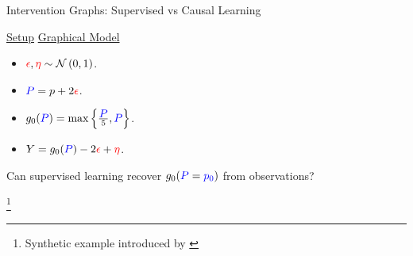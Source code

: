 \documentclass[xcolor={dvipsnames}]{beamer}
\newcommand{\source}[1]{{\let\thefootnote\relax\footnote{{\tiny #1}}}}
\newcommand{\policy}{\mbox{\textcolor{blue}{$P$}}}
\newcommand{\response}{\mbox{\textcolor{black}{$Y$}}}
\newcommand{\confounder}{\mbox{\textcolor{red}{$\epsilon$}}}
\begin{document}
    \begin{frame}{Intervention Graphs: Supervised vs Causal Learning}

        \begin{center} \Large \underline{Setup} \hspace{4cm} \underline{Graphical Model} \end{center}

        \begin{minipage}[c]{0.55\textwidth}
            \begin{itemize}
                \item \( \confounder{}, \textcolor{red}{\eta} \sim \calN\rbr{0,1} \).
                \item \( \policy{} = p + 2 \confounder{} \).
                \item \( g_0(\policy{}) = \max\cbr{\frac{\policy{}}{5}, \policy{}} \).
                \item \( \response{} = g_0(\policy{}) - 2 \confounder{} + \textcolor{red}{\eta} \).
            \end{itemize}
        \end{minipage}
        \begin{minipage}[c]{0.43\textwidth}
            \begin{figure}
                \centering
                
            \end{figure}
        \end{minipage}

        \vspace{0.5cm}
        \begin{center}
            Can supervised learning recover \( g_0(\policy{} = \textcolor{blue}{p_0}) \) from observations?
        \end{center}

        \source{Synthetic example introduced by \citet{bennett2019deep}}

    \end{frame}
\end{document}
